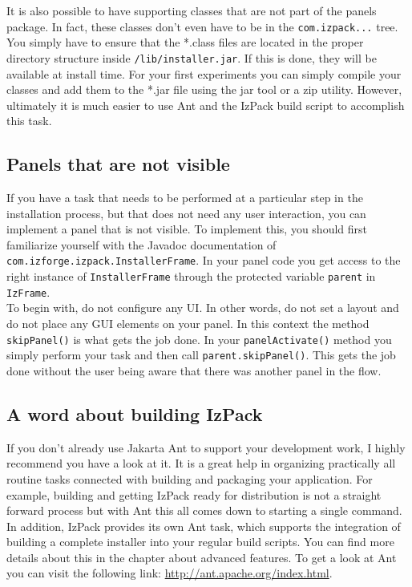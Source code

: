 It is also possible to have supporting classes that are not part of the
panels package.  In fact, these classes don't even have to be in the
\texttt{com.izpack...} tree.  You simply have to ensure that the *.class
files are located in the proper directory structure inside
\texttt{/lib/installer.jar}.  If this is done, they will be available at
install time.  For your first experiments you can simply compile your
classes and add them to the *.jar file using the jar tool or a zip
utility.  However, ultimately it is much easier to use Ant and the IzPack
build script to accomplish this task.\\

\subsection{Panels that are not visible}

If you have a task that needs to be performed at a particular step in
the installation process, but that does not need any user interaction, you
can implement a panel that is not visible.  To implement this, you should
first familiarize yourself with the Javadoc documentation of
\texttt{com.izforge.izpack.InstallerFrame}.  In your panel code you get
access to the right instance of \texttt{InstallerFrame} through the
protected variable \texttt{parent} in \texttt{IzFrame}.\\

To begin with, do not configure any UI.  In other words, do not set a
layout and do not place any GUI elements on your panel.  In this context
the method \texttt{skipPanel()} is what gets the job done.  In your
\texttt{panelActivate()} method you simply perform your task and then call
\texttt{parent.skipPanel()}.  This gets the job done without the user
being aware that there was another panel in the flow.\\

\subsection{A word about building IzPack}

If you don't already use Jakarta Ant to support your development work, I
highly recommend you have a look at it.  It is a great help in organizing
practically all routine tasks connected with building and packaging your
application.  For example, building and getting IzPack ready for
distribution is not a straight forward process but with Ant this all comes
down to starting a single command.  In addition, IzPack provides its own
Ant task, which supports the integration of building a complete installer
into your regular build scripts.  You can find more details about this in
the chapter about advanced features.  To get a look at Ant you can visit
the following link: \url{http://ant.apache.org/index.html}.\\

